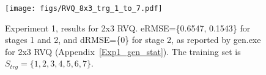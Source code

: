 \begin{table}
\centering
{}\hspace{0.2in}
\hspace{0.2in}
\hspace{0.2in}
\hspace{0.2in}
\hspace{0.2in}
\hspace{0.2in}
\caption{Experiment 1, RVQ \emph{decoder} codebooks with increasing code-vectors per stage, $m$~=~{\color{red}\textbf {2, 3, 4, 5, 6, 7, 8}}.}
\label{table:Exp1_decoder}
\end{table}



							\begin{figure}
							\centering
							\texttt{[image: figs/RVQ\_8x3\_trg\_1\_to\_7.pdf]}
							\caption{Experiment 1, results for 2x3 RVQ.  eRMSE=\{0.6547, 0.1543\} for stages 1 and 2, and dRMSE=\{0\} for stage 2, as reported by gen.exe for 2x3 RVQ (Appendix~\ref{Exp1_gen_stat}).  The training set is $S_{trg}=\{1,2,3,4,5,6,7\}$.}
							\label{fig:RVQ_8x3_trg_1_to_7}
							\end{figure}


